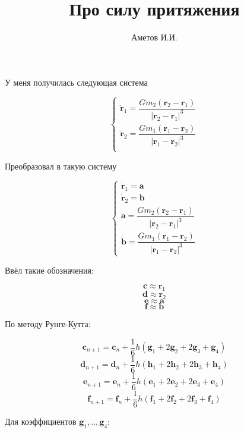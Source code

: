 \documentclass[11pt]{article}
\title{Про силу притяжения}
\author{Аметов И.И.}
\begin{document}
\maketitle
У меня получилась следующая система

\begin{equation*}
\begin{cases}
\ddot {\boldsymbol r}_1 = \dfrac {G m_2(\boldsymbol r_2 - \boldsymbol r_1)} {|\boldsymbol r_2 - \boldsymbol r_1|^3} \\
\ddot {\boldsymbol r}_2 = \dfrac {G m_1(\boldsymbol r_1 - \boldsymbol r_2)} {|\boldsymbol r_1 - \boldsymbol r_2|^3} \\
\end{cases}
\end{equation*}

Преобразовал в такую систему

\begin{equation*}
\begin{cases}
\dot {\boldsymbol r}_1 = \boldsymbol a \\
\dot {\boldsymbol r}_2 = \boldsymbol b \\
\dot {\boldsymbol a} = \dfrac {G m_2(\boldsymbol r_2 - \boldsymbol r_1)} {|\boldsymbol r_2 - \boldsymbol r_1|^3} \\
\dot {\boldsymbol b} = \dfrac {G m_1(\boldsymbol r_1 - \boldsymbol r_2)} {|\boldsymbol r_1 - \boldsymbol r_2|^3}
\end{cases}
\end{equation*}

Ввёл такие обозначения:

$$\boldsymbol c \approx \boldsymbol r_1$$
$$\boldsymbol d \approx \boldsymbol r_2$$
$$\boldsymbol e \approx \boldsymbol a$$
$$\boldsymbol f \approx \boldsymbol b$$

По методу Рунге-Кутта:

$$\boldsymbol c_{n+1} = \boldsymbol c_n + \dfrac {1}{6} h ( \boldsymbol g_1 + 2 \boldsymbol g_2 + 2 \boldsymbol g_3 + \boldsymbol g_4)$$
$$\boldsymbol d_{n+1} = \boldsymbol d_n + \dfrac {1}{6} h ( \boldsymbol h_1 + 2 \boldsymbol h_2 + 2 \boldsymbol h_3 + \boldsymbol h_4)$$
$$\boldsymbol e_{n+1} = \boldsymbol e_n + \dfrac {1}{6} h ( \boldsymbol e_1 + 2 \boldsymbol e_2 + 2 \boldsymbol e_3 + \boldsymbol e_4)$$
$$\boldsymbol f_{n+1} = \boldsymbol f_n + \dfrac {1}{6} h ( \boldsymbol f_1 + 2 \boldsymbol f_2 + 2 \boldsymbol f_3 + \boldsymbol f_4)$$

Для коэффициентов $\boldsymbol g_1, .., \boldsymbol g_4$:
\end{document}

